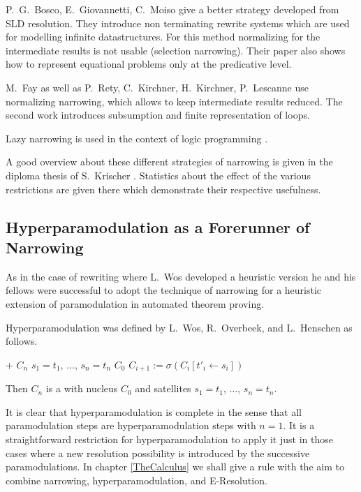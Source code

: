P.\ G.\ Bosco, E.\ Giovannetti, C.\ Moiso \cite{BoGiMo88} give a better 
strategy developed from 
SLD resolution. They introduce non terminating rewrite systems
which are used for modelling infinite datastructures.
For this method normalizing for the intermediate results is 
not usable (selection narrowing). Their paper also shows how
to represent equational problems only at the
predicative level.

M.\ Fay \cite{Fay79} as well as P.\ Rety, C.\ Kirchner, H.\ Kirchner,
P.\ Lescanne 
\cite{ReKiKiLe85} use normalizing narrowing, which allows to keep
intermediate results reduced. 
The second work   introduces subsumption and finite representation of loops.

Lazy narrowing is used in the context of logic programming \cite{Reddy85,DaGu89}.

A good overview about these different strategies of narrowing is given
in the diploma thesis of S.\ Krischer \cite{Krischer90}.
Statistics about the effect of the various restrictions are given there
which demonstrate their respective usefulness.



\subsection{Hyperparamodulation as a Forerunner of Narrowing}
\label{Hyperparamodulation}

As in the case of rewriting where L.\ Wos developed a heuristic version
he and his fellows were successful to adopt the technique of narrowing for
a heuristic extension of paramodulation in automated theorem proving.

Hyperparamodulation was defined by L.\ Wos, R.\ Overbeek, and L.\ Henschen
\cite{WoOvHe80} as follows.
\begin{Def}[Hyperparamodulation]
\return\vspace{-3mm}
\label{DefHyperparamodulation}

\hlineblockthree%
{+}%
{$C_n$}%
{$s_1=t_1$, $\dots$, $s_n=t_n$}%
{$C_0$}%
{$C_{i+1} := \sigma(C_i[t'_i\leftarrow s_i])$}

Then $C_n$ is a  with nucleus $C_0$ and
satellites $s_1=t_1$, $\dots$, $s_n=t_n$.
\end{Def}

It is clear that hyperparamodulation is complete in the sense that all
paramodulation steps are hyperparamodulation steps with $n=1$. It is a
straightforward restriction for hyperparamodulation to apply it just in
those cases where a new resolution possibility is introduced by the
successive paramodulations. In chapter \ref{TheCalculus} we shall give a
rule with the aim to combine narrowing, hyperparamodulation, and
E-Resolution.
